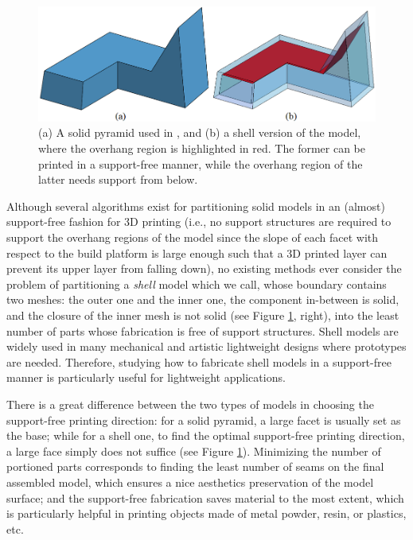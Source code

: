 \begin{figure}[t!]
  \centering
  \includegraphics[width=\linewidth]{figs/solid_hollow.png}
  \caption{\label{fig:solid_hollow}%
  (a) A solid pyramid used in \cite{Hu_siga14}, and (b) a shell version of the model, {where the overhang region is highlighted in red}. The former can be printed in a support-free manner, while the overhang region of the latter needs support from below.}
\end{figure}

Although several algorithms exist for partitioning solid models in an (almost) support-free fashion \cite{Hu_siga14} for 3D printing (i.e., no support structures are required to support the overhang regions of the model since the slope of each facet with respect to the build platform is large enough such that a 3D printed layer can prevent its upper layer from falling down), no existing methods ever consider the problem of partitioning a \emph{shell} model which we call, whose boundary contains two meshes: the outer one and the inner one, the component in-between is solid, and the closure of the inner mesh is not solid (see Figure \ref{fig:solid_hollow}, right), into the least number of parts whose fabrication is free of support structures. Shell models are widely used in many mechanical and artistic lightweight designs where prototypes are needed. Therefore, studying how to fabricate shell models in a support-free manner is particularly useful for lightweight applications.



There is a great difference between the two types of models in choosing the support-free printing direction: for a solid pyramid, a large facet is usually set as the base; while for a shell one, to find the optimal support-free printing direction, a large face simply does not suffice (see Figure \ref{fig:solid_hollow}). Minimizing the number of portioned parts corresponds to finding the least number of seams on the final assembled model, which ensures a nice aesthetics preservation of the model surface; and the support-free fabrication saves material to the most extent, which is particularly helpful in printing objects made of metal powder, resin, or plastics, etc.



